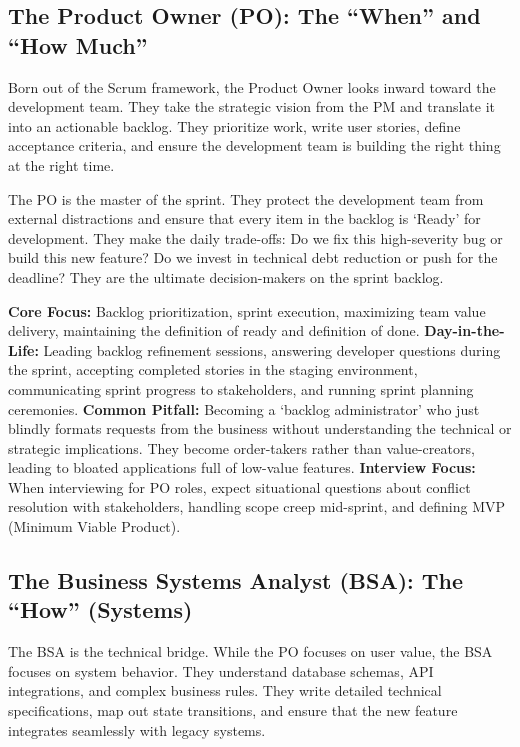 \subsection{The Product Owner (PO): The ``When'' and ``How
Much''}\label{the-product-owner-po-the-when-and-how-much}

Born out of the Scrum framework, the Product Owner looks inward toward
the development team. They take the strategic vision from the PM and
translate it into an actionable backlog. They prioritize work, write
user stories, define acceptance criteria, and ensure the development
team is building the right thing at the right time.

The PO is the master of the sprint. They protect the development team
from external distractions and ensure that every item in the backlog is
`Ready' for development. They make the daily trade-offs: Do we fix this
high-severity bug or build this new feature? Do we invest in technical
debt reduction or push for the deadline? They are the ultimate
decision-makers on the sprint backlog.

\textbf{Core Focus:} Backlog prioritization, sprint execution,
maximizing team value delivery, maintaining the definition of ready and
definition of done. \textbf{Day-in-the-Life:} Leading backlog refinement
sessions, answering developer questions during the sprint, accepting
completed stories in the staging environment, communicating sprint
progress to stakeholders, and running sprint planning ceremonies.
\textbf{Common Pitfall:} Becoming a `backlog administrator' who just
blindly formats requests from the business without understanding the
technical or strategic implications. They become order-takers rather
than value-creators, leading to bloated applications full of low-value
features. \textbf{Interview Focus:} When interviewing for PO roles,
expect situational questions about conflict resolution with
stakeholders, handling scope creep mid-sprint, and defining MVP (Minimum
Viable Product).

\subsection{The Business Systems Analyst (BSA): The ``How''
(Systems)}\label{the-business-systems-analyst-bsa-the-how-systems}

The BSA is the technical bridge. While the PO focuses on user value, the
BSA focuses on system behavior. They understand database schemas, API
integrations, and complex business rules. They write detailed technical
specifications, map out state transitions, and ensure that the new
feature integrates seamlessly with legacy systems.

